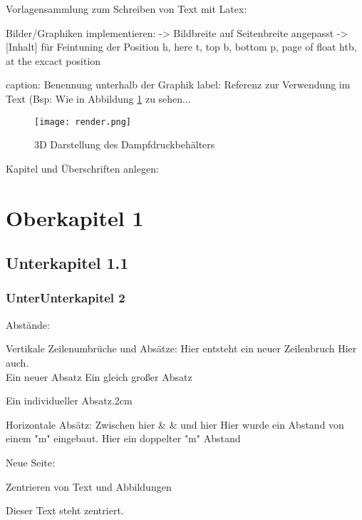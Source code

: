 

Vorlagensammlung zum Schreiben von Text mit Latex:



Bilder/Graphiken implementieren:
-> Bildbreite auf Seitenbreite angepasst
-> [Inhalt] für Feintuning der Position
    h, here
    t, top
    b, bottom
    p, page of float
    htb, at the excact position


caption: Benennung unterhalb der Graphik
label: Referenz zur Verwendung im Text (Bsp: Wie in Abbildung \ref{fig:render} zu sehen...

\begin{figure}[htb]
    \centering  
    \texttt{[image: render.png]}
    \caption{3D Darstellung des Dampfdruckbehälters}\label{fig:render}
\end{figure}



Kapitel und Überschriften anlegen:
\chapter{Oberkapitel 1}
\section{Unterkapitel 1.1}
\subsection*{UnterUnterkapitel 2}            %


Abstände: 

Vertikale Zeilenumbrüche und Absätze:
Hier entsteht ein neuer Zeilenbruch\newline
Hier auch.\\ %
Ein neuer Absatz\parskip                    %
Ein gleich großer Absatz\par
Ein individueller Absatz.\vfill{2cm}   


Horizontale Absätz: 
Zwischen hier & & und hier 
Hier \quad wurde ein Abstand von einem "m" eingebaut.
Hier \qquad ein doppelter "m" Abstand


Neue Seite: \newpage



Zentrieren von Text und Abbildungen
\begin{center}
    Dieser Text steht zentriert.
\end{center}


